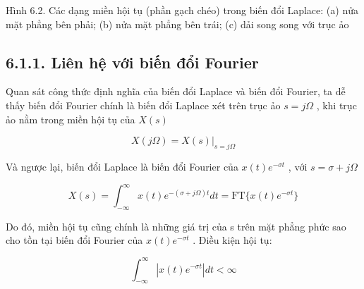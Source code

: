 \documentclass[
  10
]{article}
\begin{document}
Hình 6.2. Các dạng miền hội tụ (phần gạch chéo) trong biến đổi Laplace:
(a) nửa mặt phẳng bên phải; (b) nửa mặt phẳng bên trái; (c) dải song
song với trục ảo

\subsection{6.1.1. Liên hệ với biến đổi
Fourier}\label{liuxean-hux1ec7-vux1edbi-biux1ebfn-ux111ux1ed5i-fourier}

Quan sát công thức định nghĩa của biến đổi Laplace và biến đổi Fourier,
ta dễ thấy biến đổi Fourier chính là biến đổi Laplace xét trên trục ảo
\(s = j \Omega\) , khi trục ảo nằm trong miền hội tụ của \(X ( s )\)

\[
X (j \Omega) = X (s) | _ {s = j \Omega}\tag{6.2}
\]

Và ngược lại, biến đổi Laplace là biến đổi Fourier của
\(x ( t ) e ^ { - \sigma t }\) , với \(s = \sigma + j \Omega\)

\[
X (s) = \int_ {- \infty} ^ {\infty} x (t) e ^ {- (\sigma + j \Omega) t} d t = \mathrm{FT} \{x (t) e ^ {- \sigma t} \}\tag{6.3}
\]

Do đó, miền hội tụ cũng chính là những giá trị của s trên mặt phẳng phức
sao cho tồn tại biến đổi Fourier của \(x ( t ) e ^ { - \sigma t }\) .
Điều kiện hội tụ:

\[
\int_ {- \infty} ^ {\infty} | x (t) e ^ {- \sigma t} | d t <   \infty
\]
\end{document}
